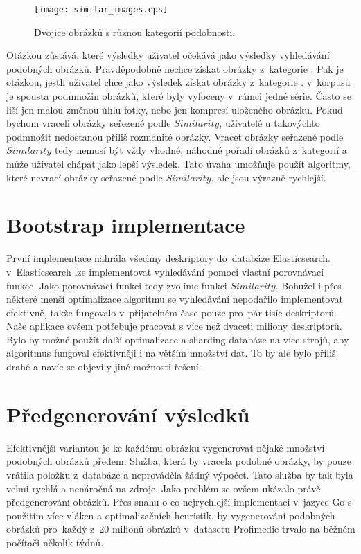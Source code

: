 \begin{figure}[h]
  \centering
  \texttt{[image: similar\_images.eps]}
  \caption{Dvojice obrázků s různou kategorií podobnosti.}
  \label{fig:simexamples}
\end{figure}

Otázkou zůstává, které výsledky uživatel očekává jako výsledky vyhledávání podobných obrázků. Pravděpodobně nechce získat obrázky z~kategorie . Pak je otázkou, jestli uživatel chce jako výsledek získat obrázky z~kategorie . v~korpusu je spousta podmnožin obrázků, které byly vyfoceny v~rámci jedné série. Často se liší jen malou změnou úhlu fotky, nebo jen kompresí uloženého obrázku. Pokud bychom vraceli obrázky seřezené podle $Similarity$, uživatelé u takovýchto podmnožit nedostanou příliš rozmanité obrázky. Vracet obrázky seřazené podle $Similarity$ tedy nemusí být vždy vhodné, náhodné pořadí obrázků z~kategorií  a  může uživatel chápat jako lepší výsledek. Tato úvaha umožňuje použít algoritmy, které nevrací obrázky seřazené podle $Similarity$, ale jsou výrazně rychlejší.


\section{Bootstrap implementace}

První implementace nahrála všechny deskriptory do~databáze Elasticsearch\cite{elasticsearch}. v~Elasticsearch lze implementovat vyhledávání pomocí vlastní porovnávací funkce. Jako porovnávací funkci tedy zvolíme funkci $Similarity$. Bohužel i přes některé menší optimalizace algoritmu se vyhledávání nepodařilo implementovat efektivně, takže fungovalo v~přijatelném čase pouze pro~pár tisíc deskriptorů. Naše aplikace ovšem potřebuje pracovat s více než dvaceti miliony deskriptorů. Bylo by možné použít další optimalizace a sharding databáze na více strojů, aby algoritmus fungoval efektivněji i na větším množství dat. To by ale bylo příliš drahé a navíc se objevily jiné možnosti řešení.


\section{Předgenerování výsledků}

Efektivnější variantou je ke každému obrázku vygenerovat nějaké množství podobných obrázků předem. Služba, která by vracela podobné obrázky, by pouze vrátila položku z~databáze a neprováděla žádný výpočet. Tato služba by tak byla velmi rychlá a nenáročná na zdroje. Jako problém se ovšem ukázalo právě předgenerování obrázků. Přes snahu o co nejrychlejší implementaci v~jazyce Go s použitím více vláken a optimalizačních heuristik, by vygenerování podobných obrázků pro~každý z~20 milionů obrázků v~datasetu Profimedie trvalo na běžném počítači několik týdnů.

